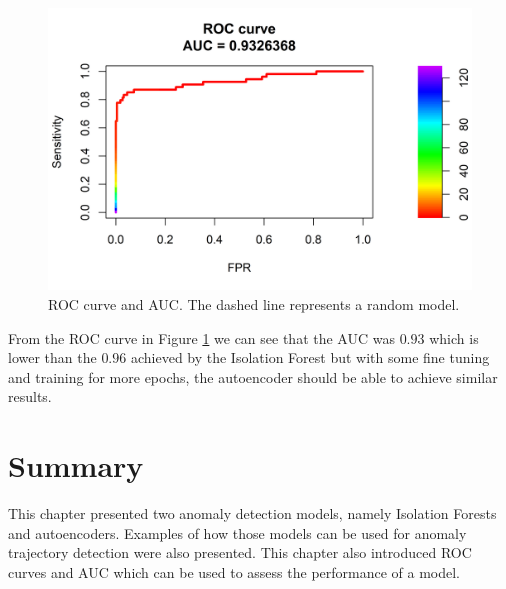 \documentclass[
  11pt,
]{krantz}
\begin{document}
\begin{figure}

{\centering \includegraphics[width=0.9\linewidth]{images/roc_curve_autoencoder} 

}

\caption{ROC curve and AUC. The dashed line represents a random model.}\label{fig:rocAutoencoder}
\end{figure}

From the ROC curve in Figure \ref{fig:rocAutoencoder} we can see that the AUC was \(0.93\) which is lower than the \(0.96\) achieved by the Isolation Forest but with some fine tuning and training for more epochs, the autoencoder should be able to achieve similar results.

\hypertarget{SummaryAnomalyDetection}{%
\section{Summary}\label{SummaryAnomalyDetection}}

This chapter presented two anomaly detection models, namely Isolation Forests and autoencoders. Examples of how those models can be used for anomaly trajectory detection were also presented. This chapter also introduced ROC curves and AUC which can be used to assess the performance of a model.
\end{document}
